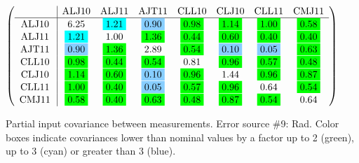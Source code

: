 \begin{table}[H]
\scriptsize
\begin{center}
\renewcommand{\arraystretch}{1.1}
\begin{math}\left(\begin{array}{c|ccccccc}
 & \mathrm{ALJ10} & 
\mathrm{ALJ11} & 
\mathrm{AJT11} & 
\mathrm{CLL10} & 
\mathrm{CLJ10} & 
\mathrm{CLL11} & 
\mathrm{CMJ11} \\
\hline
\mathrm{ALJ10} \hspace*{2pt} &       6.25 &  \colorbox{Cyan1}{$      1.21$} &  \colorbox{SkyBlue1}{$      0.90$} &  \colorbox{Green1}{$      0.98$} &  \colorbox{Green1}{$      1.14$} &  \colorbox{Green1}{$      1.00$} &  \colorbox{Green1}{$      0.58$} \\
\mathrm{ALJ11} \hspace*{2pt} &  \colorbox{Cyan1}{$      1.21$} &       1.00 &  \colorbox{Green1}{$      1.36$} &  \colorbox{Green1}{$      0.44$} &  \colorbox{Green1}{$      0.60$} &  \colorbox{Green1}{$      0.40$} &  \colorbox{Green1}{$      0.40$} \\
\mathrm{AJT11} \hspace*{2pt} &  \colorbox{SkyBlue1}{$      0.90$} &  \colorbox{Green1}{$      1.36$} &       2.89 &  \colorbox{Green1}{$      0.54$} &  \colorbox{SkyBlue1}{$      0.10$} &  \colorbox{SkyBlue1}{$      0.05$} &  \colorbox{Green1}{$      0.63$} \\
\mathrm{CLL10} \hspace*{2pt} &  \colorbox{Green1}{$      0.98$} &  \colorbox{Green1}{$      0.44$} &  \colorbox{Green1}{$      0.54$} &       0.81 &  \colorbox{Green1}{$      0.96$} &  \colorbox{Green1}{$      0.57$} &  \colorbox{Green1}{$      0.48$} \\
\mathrm{CLJ10} \hspace*{2pt} &  \colorbox{Green1}{$      1.14$} &  \colorbox{Green1}{$      0.60$} &  \colorbox{SkyBlue1}{$      0.10$} &  \colorbox{Green1}{$      0.96$} &       1.44 &  \colorbox{Green1}{$      0.96$} &  \colorbox{Green1}{$      0.87$} \\
\mathrm{CLL11} \hspace*{2pt} &  \colorbox{Green1}{$      1.00$} &  \colorbox{Green1}{$      0.40$} &  \colorbox{SkyBlue1}{$      0.05$} &  \colorbox{Green1}{$      0.57$} &  \colorbox{Green1}{$      0.96$} &       0.64 &  \colorbox{Green1}{$      0.54$} \\
\mathrm{CMJ11} \hspace*{2pt} &  \colorbox{Green1}{$      0.58$} &  \colorbox{Green1}{$      0.40$} &  \colorbox{Green1}{$      0.63$} &  \colorbox{Green1}{$      0.48$} &  \colorbox{Green1}{$      0.87$} &  \colorbox{Green1}{$      0.54$} &       0.64 \\
\end{array}\right)\end{math}
\caption{Partial input covariance between measurements. Error source \#9: Rad. Color boxes indicate covariances lower than nominal values by a factor up to 2 (green), up to 3 (cyan) or greater than 3 (blue).}
\renewcommand{\arraystretch}{1}
\end{center}
\end{table}
